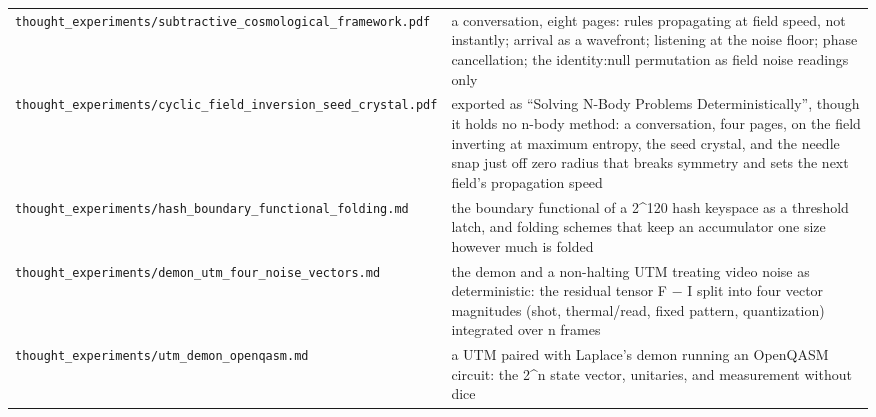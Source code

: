 {\begin{longtable}{>{\RaggedRight\arraybackslash}p{}>{\RaggedRight\arraybackslash}p{}}
\texttt{thought\_\allowbreak{}experiments/\allowbreak{}subtractive\_\allowbreak{}cosmological\_\allowbreak{}framework.\allowbreak{}pdf} & a conversation, eight pages: rules propagating at field speed, not instantly; arrival as a wavefront; listening at the noise floor; phase cancellation; the identity:null permutation as field noise readings only \\
\texttt{thought\_\allowbreak{}experiments/\allowbreak{}cyclic\_\allowbreak{}field\_\allowbreak{}inversion\_\allowbreak{}seed\_\allowbreak{}crystal.\allowbreak{}pdf} & exported as “Solving N-Body Problems Deterministically”, though it holds no n-body method: a conversation, four pages, on the field inverting at maximum entropy, the seed crystal, and the needle snap just off zero radius that breaks symmetry and sets the next field's propagation speed \\
\texttt{thought\_\allowbreak{}experiments/\allowbreak{}hash\_\allowbreak{}boundary\_\allowbreak{}functional\_\allowbreak{}folding.\allowbreak{}md} & the boundary functional of a 2\textasciicircum{}120 hash keyspace as a threshold latch, and folding schemes that keep an accumulator one size however much is folded \\
\texttt{thought\_\allowbreak{}experiments/\allowbreak{}demon\_\allowbreak{}utm\_\allowbreak{}four\_\allowbreak{}noise\_\allowbreak{}vectors.\allowbreak{}md} & the demon and a non-halting UTM treating video noise as deterministic: the residual tensor F − I split into four vector magnitudes (shot, thermal/read, fixed pattern, quantization) integrated over n frames \\
\texttt{thought\_\allowbreak{}experiments/\allowbreak{}utm\_\allowbreak{}demon\_\allowbreak{}openqasm.\allowbreak{}md} & a UTM paired with Laplace's demon running an OpenQASM circuit: the 2\textasciicircum{}n state vector, unitaries, and measurement without dice \\
\bottomrule
\end{longtable}
}
